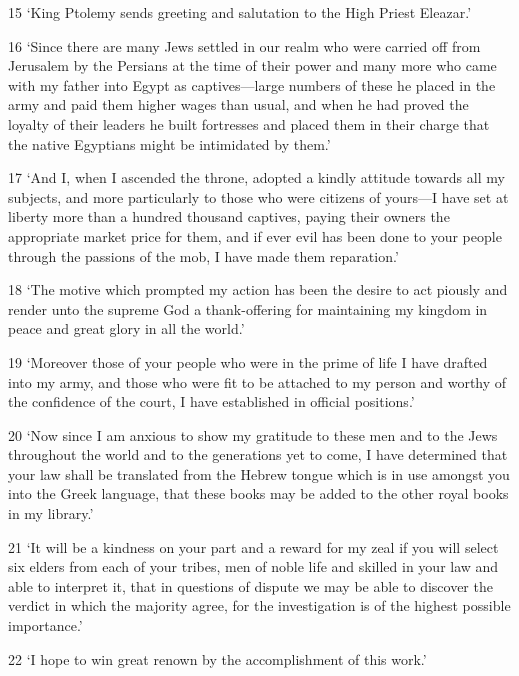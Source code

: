 \par 15 ‘King Ptolemy sends greeting and salutation to the High Priest Eleazar.’

\par 16 ‘Since there are many Jews settled in our realm who were carried off from Jerusalem by the Persians at the time of their power and many more who came with my father into Egypt as captives—large numbers of these he placed in the army and paid them higher wages than usual, and when he had proved the loyalty of their leaders he built fortresses and placed them in their charge that the native Egyptians might be intimidated by them.’

\par 17 ‘And I, when I ascended the throne, adopted a kindly attitude towards all my subjects, and more particularly to those who were citizens of yours—I have set at liberty more than a hundred thousand captives, paying their owners the appropriate market price for them, and if ever evil has been done to your people through the passions of the mob, I have made them reparation.’

\par 18 ‘The motive which prompted my action has been the desire to act piously and render unto the supreme God a thank-offering for maintaining my kingdom in peace and great glory in all the world.’

\par 19 ‘Moreover those of your people who were in the prime of life I have drafted into my army, and those who were fit to be attached to my person and worthy of the confidence of the court, I have established in official positions.’

\par 20 ‘Now since I am anxious to show my gratitude to these men and to the Jews throughout the world and to the generations yet to come, I have determined that your law shall be translated from the Hebrew tongue which is in use amongst you into the Greek language, that these books may be added to the other royal books in my library.’

\par 21 ‘It will be a kindness on your part and a reward for my zeal if you will select six elders from each of your tribes, men of noble life and skilled in your law and able to interpret it, that in questions of dispute we may be able to discover the verdict in which the majority agree, for the investigation is of the highest possible importance.’

\par 22 ‘I hope to win great renown by the accomplishment of this work.’

